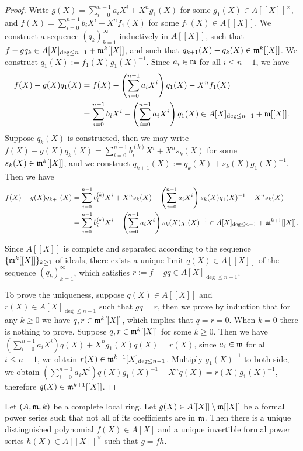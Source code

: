 \begin{proof}
Write $g(X)=\sum_{i=0}^{n-1}a_iX^i+X^ng_1(X)$ for some $g_1(X)\in A[[X]]^\times$, and
$f(X)=\sum_{i=0}^{n-1}b_iX^i+X^nf_1(X)$ for some $f_1(X)\in A[[X]]$.
We construct a sequence $(q_k)_{k=1}^\infty$ inductively in $A[[X]]$,
such that $f-gq_k\in A[X]_{\deg\leq n-1}+{\mathfrak{m}}^k[[X]]$,
and such that $q_{k+1}(X)-q_k(X)\in{\mathfrak{m}}^k[[X]]$.
We construct $q_1(X):=f_1(X)g_1(X)^{-1}$.
Since $a_i\in{\mathfrak{m}}$ for all $i\leq n-1$, we have
\begin{align*}
f(X)-g(X)q_1(X)&=f(X)-\left(\sum_{i=0}^{n-1}a_iX^i\right)q_1(X)
-X^nf_1(X) \\
&=\sum_{i=0}^{n-1}b_iX^i-\left(\sum_{i=0}^{n-1}a_iX^i\right)q_1(X)
\in A[X]_{\deg\leq n-1}+{\mathfrak{m}}[[X]].
\end{align*}
Suppose $q_k(X)$ is constructed, then we may write
$f(X)-g(X)q_k(X)=\sum_{i=0}^{n-1}b_i^{(k)}X^i+X^ns_k(X)$
for some $s_k(X)\in{\mathfrak{m}}^k[[X]]$, and we construct
$q_{k+1}(X):=q_k(X)+s_k(X)g_1(X)^{-1}$. Then we have
\begin{align*}
f(X)-g(X)q_{k+1}(X)&=\sum_{i=0}^{n-1}b_i^{(k)}X^i+X^ns_k(X)
-\left(\sum_{i=0}^{n-1}a_iX^i\right)s_k(X)g_1(X)^{-1}
-X^ns_k(X) \\
&=\sum_{i=0}^{n-1}b_i^{(k)}X^i-\left(\sum_{i=0}^{n-1}a_iX^i\right)s_k(X)g_1(X)^{-1}
\in A[X]_{\deg\leq n-1}+{\mathfrak{m}}^{k+1}[[X]].
\end{align*}

Since $A[[X]]$ is complete and separated according to the sequence
$\{{\mathfrak{m}}^k[[X]]\}_{k\geq 1}$ of ideals, there exists a unique limit $q(X)\in A[[X]]$
of the sequence $(q_k)_{k=1}^\infty$, which satisfies $r:=f-gq\in A[X]_{\deg\leq n-1}$.

To prove the uniqueness, suppose $q(X)\in A[[X]]$ and $r(X)\in A[X]_{\deg\leq n-1}$
such that $gq=r$, then we prove by induction that for any $k\geq 0$
we have $q,r\in{\mathfrak{m}}^k[[X]]$, which implies that $q=r=0$.
When $k=0$ there is nothing to prove. Suppose $q,r\in{\mathfrak{m}}^k[[X]]$ for some $k\geq 0$.
Then we have $(\sum_{i=0}^{n-1}a_iX^i)q(X)+X^ng_1(X)q(X)=r(X)$,
since $a_i\in{\mathfrak{m}}$ for all $i\leq n-1$, we obtain $r(X)\in{\mathfrak{m}}^{k+1}[X]_{\deg\leq n-1}$.
Multiply $g_1(X)^{-1}$ to both side,
we obtain $(\sum_{i=0}^{n-1}a_iX^i)q(X)g_1(X)^{-1}+X^nq(X)=r(X)g_1(X)^{-1}$,
therefore $q(X)\in{\mathfrak{m}}^{k+1}[[X]]$.
\end{proof}

\begin{prop}
\label{weierstrass-preparation}
Let $(A,{\mathfrak{m}},k)$ be a complete local ring.
Let $g(X)\in A[[X]]\setminus{\mathfrak{m}}[[X]]$ be a formal power series
such that not all of its coefficients are in ${\mathfrak{m}}$.
Then there is a unique distinguished polynomial $f(X)\in A[X]$
and a unique invertible formal power series $h(X)\in A[[X]]^\times$ such that $g=fh$.
\end{prop}

